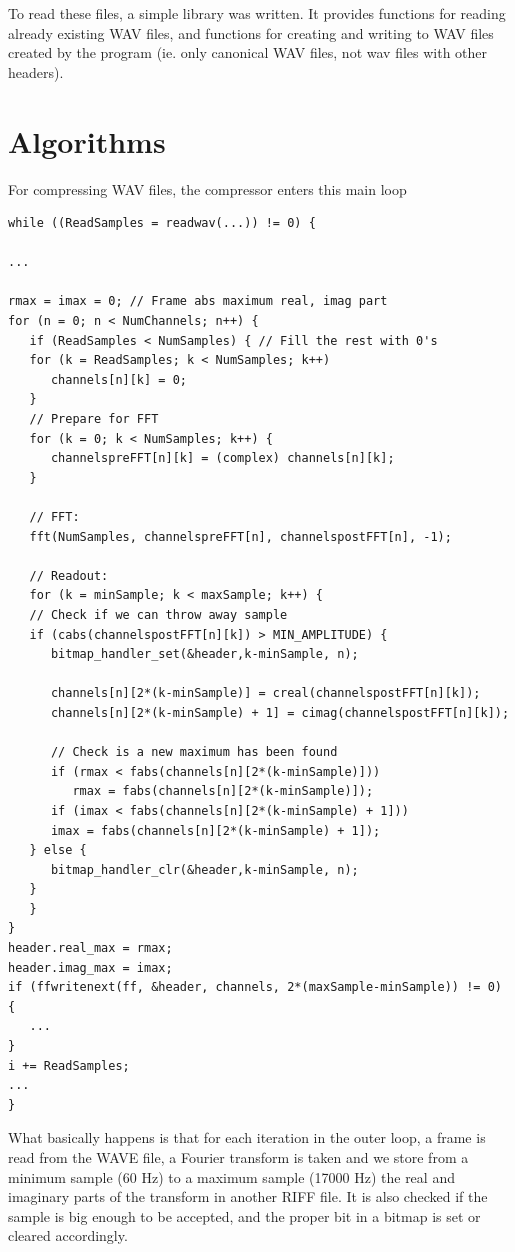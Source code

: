 \documentclass[a4paper,11pt]{article}
\begin{document}
To read these files, a simple library was written. It provides functions
for reading already existing WAV files, and functions for creating and writing
to WAV files created by the program (ie. only canonical WAV files, not
wav files with other headers).

\section{Algorithms}

For compressing WAV files, the compressor enters this
main loop
\begin{lstlisting}
while ((ReadSamples = readwav(...)) != 0) {

...

rmax = imax = 0; // Frame abs maximum real, imag part
for (n = 0; n < NumChannels; n++) {
   if (ReadSamples < NumSamples) { // Fill the rest with 0's
   for (k = ReadSamples; k < NumSamples; k++)
      channels[n][k] = 0;
   }
   // Prepare for FFT
   for (k = 0; k < NumSamples; k++) {
      channelspreFFT[n][k] = (complex) channels[n][k];
   }

   // FFT:
   fft(NumSamples, channelspreFFT[n], channelspostFFT[n], -1);

   // Readout:
   for (k = minSample; k < maxSample; k++) {
   // Check if we can throw away sample
   if (cabs(channelspostFFT[n][k]) > MIN_AMPLITUDE) {
      bitmap_handler_set(&header,k-minSample, n);

      channels[n][2*(k-minSample)] = creal(channelspostFFT[n][k]);
      channels[n][2*(k-minSample) + 1] = cimag(channelspostFFT[n][k]);

      // Check is a new maximum has been found
      if (rmax < fabs(channels[n][2*(k-minSample)]))
         rmax = fabs(channels[n][2*(k-minSample)]);
      if (imax < fabs(channels[n][2*(k-minSample) + 1]))
      imax = fabs(channels[n][2*(k-minSample) + 1]);
   } else {
      bitmap_handler_clr(&header,k-minSample, n);
   }
   }
}
header.real_max = rmax;
header.imag_max = imax;
if (ffwritenext(ff, &header, channels, 2*(maxSample-minSample)) != 0) {
   ...
}
i += ReadSamples;
...
}
\end{lstlisting}

What basically happens is that for each iteration in the outer loop,
a frame is read from the WAVE file, a Fourier transform is taken
and we store from a minimum sample (60 Hz) to a maximum sample (17000 Hz)
the real and imaginary parts of the transform in another RIFF
file. It is also checked if the sample is big enough to be accepted,
and the proper bit in a bitmap is set or cleared accordingly.
\end{document}
